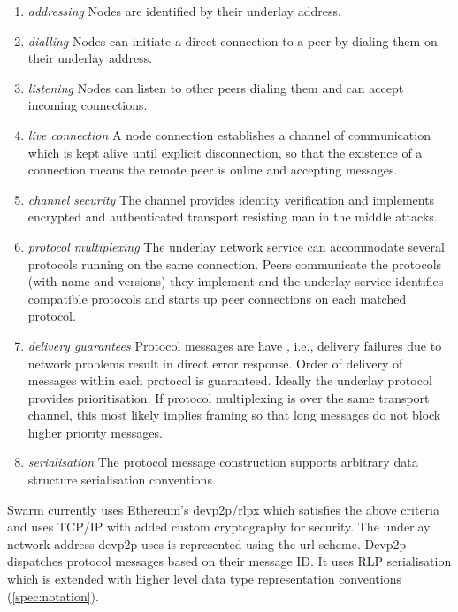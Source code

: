 \begin{enumerate}
    \item \emph{addressing} Nodes are identified by their underlay address.
    \item \emph{dialling} Nodes can initiate a direct connection to a peer by dialing them on their underlay address.
    \item \emph{listening} Nodes can listen to other peers dialing them and can accept incoming connections.
    \item \emph{live connection} A node connection establishes a channel of communication which is kept alive until explicit disconnection, so that the existence of a connection means the remote peer is online and accepting messages.
    \item \emph{channel security} 
    The channel provides identity verification and implements encrypted and authenticated transport resisting man in the middle attacks.
    \item \emph{protocol multiplexing} 
    The underlay network service can accommodate several protocols running on the same connection. Peers communicate the protocols (with name and versions) they implement and the underlay service identifies compatible protocols and starts up peer connections on each matched protocol. 
    \item \emph{delivery guarantees}
    Protocol messages are have , i.e., delivery failures due to network problems result in direct error response. 
    Order of delivery of messages within each protocol is guaranteed. 
    Ideally the underlay protocol provides prioritisation. 
    If protocol multiplexing is over the same transport channel, this most likely implies framing so that long messages do not block higher priority messages.
    \item \emph{serialisation} 
    The protocol message construction supports arbitrary data structure serialisation conventions.
    
\end{enumerate}

Swarm currently uses Ethereum's devp2p/rlpx which satisfies the above criteria and uses TCP/IP with added custom cryptography for security. The underlay network address devp2p uses is represented using the  url scheme. Devp2p dispatches protocol messages based on their message ID. It uses RLP serialisation which is extended with higher level data type representation conventions (\ref{spec:notation}). 

